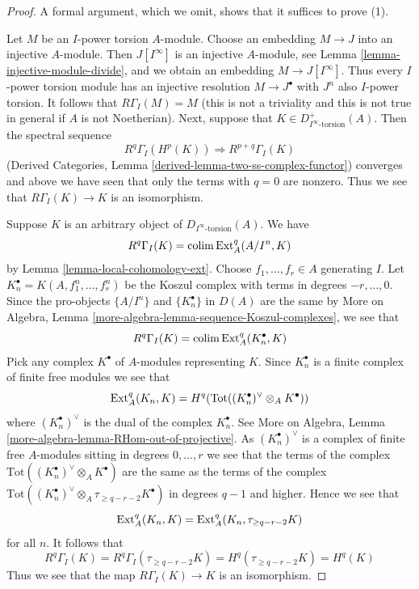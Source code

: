 \begin{proof}
A formal argument, which we omit, shows that it suffices to prove (1).

\medskip\noindent
Let $M$ be an $I$-power torsion $A$-module. Choose an embedding
$M \to J$ into an injective $A$-module. Then $J[I^\infty]$ is
an injective $A$-module, see Lemma \ref{lemma-injective-module-divide},
and we obtain an embedding $M \to J[I^\infty]$.
Thus every $I$-power torsion module has an injective resolution
$M \to J^\bullet$ with $J^n$ also $I$-power torsion. It follows
that $R\Gamma_I(M) = M$ (this is not a triviality and this is not
true in general if $A$ is not Noetherian). Next, suppose that
$K \in D_{I^\infty\text{-torsion}}^+(A)$. Then the spectral sequence
$$
R^q\Gamma_I(H^p(K)) \Rightarrow R^{p + q}\Gamma_I(K)
$$
(Derived Categories, Lemma \ref{derived-lemma-two-ss-complex-functor})
converges and above we have seen that only the terms with $q = 0$
are nonzero. Thus we see that $R\Gamma_I(K) \to K$ is an isomorphism.

\medskip\noindent
Suppose $K$ is an arbitrary object of $D_{I^\infty\text{-torsion}}(A)$.
We have
$$
R^q\Gamma_I(K) = \mathop{\mathrm{colim}}\nolimits \mathop{\mathrm{Ext}}\nolimits^q_A(A/I^n, K)
$$
by Lemma \ref{lemma-local-cohomology-ext}. Choose $f_1, \ldots, f_r \in A$
generating $I$. Let $K_n^\bullet = K(A, f_1^n, \ldots, f_r^n)$ be the
Koszul complex with terms in degrees $-r, \ldots, 0$. Since the
pro-objects $\{A/I^n\}$ and $\{K_n^\bullet\}$ in $D(A)$ are the same by
More on Algebra, Lemma \ref{more-algebra-lemma-sequence-Koszul-complexes},
we see that
$$
R^q\Gamma_I(K) = \mathop{\mathrm{colim}}\nolimits \mathop{\mathrm{Ext}}\nolimits^q_A(K_n^\bullet, K)
$$
Pick any complex $K^\bullet$ of $A$-modules representing $K$.
Since $K_n^\bullet$ is a finite complex of finite free modules we see
that
$$
\mathop{\mathrm{Ext}}\nolimits^q_A(K_n, K) =
H^q(\text{Tot}((K_n^\bullet)^\vee \otimes_A K^\bullet))
$$
where $(K_n^\bullet)^\vee$ is the dual of the complex $K_n^\bullet$.
See More on Algebra, Lemma \ref{more-algebra-lemma-RHom-out-of-projective}.
As $(K_n^\bullet)^\vee$ is a complex of finite free $A$-modules sitting
in degrees $0, \ldots, r$ we see that the terms of the complex
$\text{Tot}((K_n^\bullet)^\vee \otimes_A K^\bullet)$ are the
same as the terms of the complex
$\text{Tot}((K_n^\bullet)^\vee \otimes_A \tau_{\geq q - r - 2} K^\bullet)$
in degrees $q - 1$ and higher. Hence we see that
$$
\mathop{\mathrm{Ext}}\nolimits^q_A(K_n, K) = \text{Ext}^q_A(K_n, \tau_{\geq q - r - 2}K)
$$
for all $n$. It follows that
$$
R^q\Gamma_I(K) = R^q\Gamma_I(\tau_{\geq q - r - 2}K) =
H^q(\tau_{\geq q - r - 2}K) = H^q(K)
$$
Thus we see that the map $R\Gamma_I(K) \to K$ is an isomorphism.
\end{proof}

